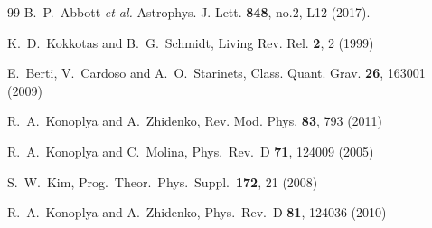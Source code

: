 \documentclass[a4paper,12pt]{article}
\begin{document}
\begin{thebibliography}{99}
B.~P.~Abbott \textit{et al.} 
Astrophys. J. Lett. \textbf{848}, no.2, L12 (2017).

K.~D.~Kokkotas and B.~G.~Schmidt,
Living Rev. Rel. \textbf{2}, 2 (1999)

E.~Berti, V.~Cardoso and A.~O.~Starinets,
Class. Quant. Grav. \textbf{26}, 163001 (2009)

R.~A.~Konoplya and A.~Zhidenko,
Rev. Mod. Phys. \textbf{83}, 793 (2011)



  R.~A.~Konoplya and C.~Molina,
  Phys.\ Rev.\ D {\bf 71}, 124009 (2005)

  S.~W.~Kim,
  Prog.\ Theor.\ Phys.\ Suppl.\  {\bf 172}, 21 (2008)

  R.~A.~Konoplya and A.~Zhidenko,
  Phys.\ Rev.\ D {\bf 81}, 124036 (2010)


\end{thebibliography}
\end{document}
